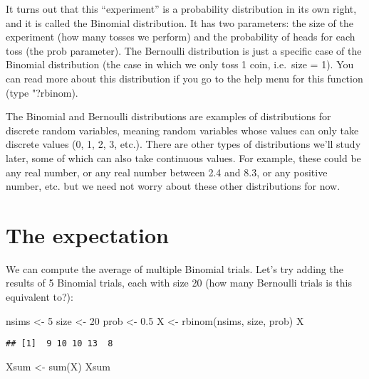 \documentclass[
]{book}
\newenvironment{Shaded}{\begin{snugshade}}{\end{snugshade}}
\newcommand{\DecValTok}[1]{\textcolor[rgb]{0.00,0.00,0.81}{#1}}
\newcommand{\FloatTok}[1]{\textcolor[rgb]{0.00,0.00,0.81}{#1}}
\newcommand{\FunctionTok}[1]{\textcolor[rgb]{0.00,0.00,0.00}{#1}}
\newcommand{\NormalTok}[1]{#1}
\newcommand{\OtherTok}[1]{\textcolor[rgb]{0.56,0.35,0.01}{#1}}
\begin{document}
It turns out that this ``experiment'' is a probability distribution in its own right, and it is called the Binomial distribution. It has two parameters: the size of the experiment (how many tosses we perform) and the probability of heads for each toss (the prob parameter). The Bernoulli distribution is just a specific case of the Binomial distribution (the case in which we only toss 1 coin, i.e.~size = 1). You can read more about this distribution if you go to the help menu for this function (type "?rbinom).

The Binomial and Bernoulli distributions are examples of distributions for discrete random variables, meaning random variables whose values can only take discrete values (0, 1, 2, 3, etc.). There are other types of distributions we'll study later, some of which can also take continuous values. For example, these could be any real number, or any real number between 2.4 and 8.3, or any positive number, etc. but we need not worry about these other distributions for now.

\hypertarget{the-expectation}{%
\section{The expectation}\label{the-expectation}}

We can compute the average of multiple Binomial trials. Let's try adding the results of 5 Binomial trials, each with size 20 (how many Bernoulli trials is this equivalent to?):

\begin{Shaded}
\begin{Highlighting}[]
\NormalTok{nsims }\OtherTok{\textless{}{-}} \DecValTok{5}
\NormalTok{size }\OtherTok{\textless{}{-}} \DecValTok{20}
\NormalTok{prob }\OtherTok{\textless{}{-}} \FloatTok{0.5}
\NormalTok{X }\OtherTok{\textless{}{-}} \FunctionTok{rbinom}\NormalTok{(nsims, size, prob)}
\NormalTok{X}
\end{Highlighting}
\end{Shaded}

\begin{verbatim}
## [1]  9 10 10 13  8
\end{verbatim}

\begin{Shaded}
\begin{Highlighting}[]
\NormalTok{Xsum }\OtherTok{\textless{}{-}} \FunctionTok{sum}\NormalTok{(X)}
\NormalTok{Xsum}
\end{Highlighting}
\end{Shaded}
\end{document}
